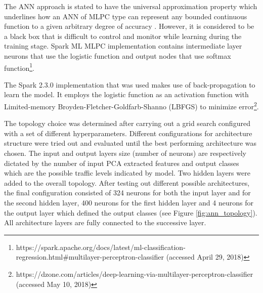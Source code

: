 \documentclass[12pt, a4paper]{report}
\theoremstyle{definition}
\theoremstyle{definition}%
\theoremstyle{definition}%
\theoremstyle{definition}%
\theoremstyle{definition}%
\theoremstyle{definition}%
\begin{document}
The ANN approach is stated to have the universal approximation property which underlines how an ANN of MLPC type can represent any bounded continuous function to a given arbitrary degree of accuracy \cite{hornik1990universal}. However, it is considered to be a black box that is difficult to control and monitor while learning during the training stage. Spark ML MLPC implementation contains intermediate layer neurons that use the logistic function and output nodes that use softmax function\footnote{https://spark.apache.org/docs/latest/ml-classification-regression.html\#multilayer-perceptron-classifier (accessed April 29, 2018)}.

The Spark 2.3.0 implementation that was used makes use of back-propagation to learn the model. It employs the logistic function as an activation function with Limited-memory Broyden-Fletcher-Goldfarb-Shanno (LBFGS) to minimize error\footnote{https://dzone.com/articles/deep-learning-via-multilayer-perceptron-classifier (accessed May 10, 2018)}.  


The topology choice was determined after carrying out a grid search configured with a set of different hyperparameters. Different configurations for architecture structure were tried out and evaluated until the best performing architecture was chosen. The input and output layers size (number of neurons) are respectively dictated by the number of input PCA extracted features and output classes which are the possible traffic levels indicated by model. Two hidden layers were added to the overall topology. After testing out different possible architectures, the final configuration consisted of 324 neurons for both the input layer and for the second hidden layer, 400 neurons for the first hidden layer and 4 neurons for the output layer which defined the output classes (see Figure \ref{fig:ann_topology}). All architecture layers are fully connected to the successive layer. 
\end{document}
